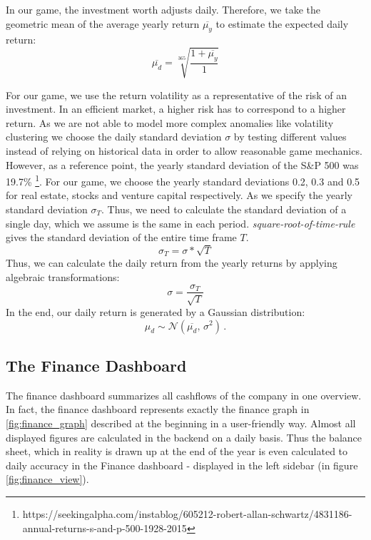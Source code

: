 In our game, the investment worth adjusts daily. Therefore, we take the geometric mean of the average yearly return $\overline{\mu_y}$ to estimate the expected daily return:
\begin{equation}
	\overline{\mu_d} = \sqrt[365]{\frac{1 + \overline{\mu_y}}{1}}
\end{equation}

For our game, we use the return volatility as a representative of the risk of an investment. In an efficient market, a higher risk has to correspond to a higher return. As we are not able to model more complex anomalies like volatility clustering \cite{lux2000volatility} we choose the daily standard deviation $\sigma$ by testing different values instead of relying on historical data in order to allow reasonable game mechanics. However, as a reference point, the yearly standard deviation of the S\&P 500 was 19.7\% \footnote{https://seekingalpha.com/instablog/605212-robert-allan-schwartz/4831186-annual-returns-s-and-p-500-1928-2015}. For our game, we choose the yearly standard deviations 0.2, 0.3 and 0.5 for real estate, stocks and venture capital respectively.
As we specify the yearly standard deviation $\sigma_T$. Thus, we need to calculate the standard deviation of a single day, which we assume is the same in each period. \textit{square-root-of-time-rule} gives the standard deviation of the entire time frame $T$.
\begin{equation}
    \sigma_T = \sigma*\sqrt{T}
\end{equation}
Thus, we can calculate the daily return from the yearly returns by applying algebraic transformations:
\begin{equation}
    \sigma = \frac{\sigma_T}{\sqrt{T}}
\end{equation}
In the end, our daily return is generated by a Gaussian distribution:
\begin{equation}
	\mu_d \sim \mathcal{N}(\overline{\mu_d},\,\sigma^{2})\,.
\end{equation}

\subsection{The Finance Dashboard}
\label{sec:finance_dashboard}

The finance dashboard summarizes all cashflows of the company in one overview. In fact, the finance dashboard represents exactly the finance graph in \ref{fig:finance_graph} described at the beginning in a user-friendly way. Almost all displayed figures are calculated in the backend on a daily basis. Thus the balance sheet, which in reality is drawn up at the end of the year is even calculated to daily accuracy in the Finance dashboard - displayed in the left sidebar (in figure \ref{fig:finance_view}).

